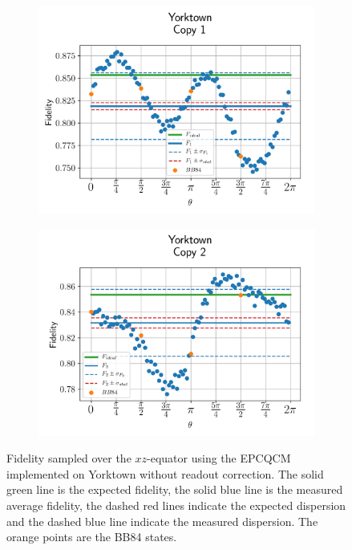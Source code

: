 \begin{figure}[H]
  \centering
  \begin{subfigure}{.5\textwidth}
    \centering
    \includegraphics[width=\textwidth]{Figures/Economical/IBM/OnlyEquator/results_ibmqx2_copy1.png}
    \label{fig:epc_uncorrected_yorktown_equator_1}
  \end{subfigure}%
  \begin{subfigure}{.5\textwidth}
    \centering
    \includegraphics[width=\textwidth]{Figures/Economical/IBM/OnlyEquator/results_ibmqx2_copy2.png}
    \label{fig:epc_uncorrected_yorktown_equator_2}
  \end{subfigure}
  \vspace{-0.5cm}
  \caption{Fidelity sampled over the $xz$-equator using the EPCQCM implemented on Yorktown without readout correction. The solid green line is the expected fidelity, the solid blue line is the measured average fidelity, the dashed red lines indicate the expected dispersion and the dashed blue line indicate the measured dispersion. The orange points are the BB84 states.}
  \label{fig:epc_uncorrected_yorktown_equator}
\end{figure}
